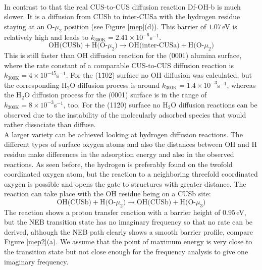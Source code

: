 \documentclass[11pt,DIV=13,BCOR=5mm,a4paper,headinclude]{scrbook}
\begin{document}
\\
In contrast to that the real CUS-to-CUS diffusion reaction Df-OH-b is much slower.
It is a diffusion from CUSb to inter-CUSa with the hydrogen residue staying at an O-$\mu_2$ position (see Figure \ref{mep}(d)).
This barrier of $1.07\,$eV is relatively high and leads to $k_{\text{300K}}=2.41\times 10^{-6}$s$^{-1}$.
\begin{equation}
 \text{OH(CUSb)} + \text{H(O-$\mu_2$)} \rightarrow \text{OH(inter-CUSa)} + \text{H(O-$\mu_2$)} \tag{Df-OH-b}
     \label{diffOHb}
\end{equation}
This is still faster than OH diffusion reaction for the (0001) alumina surface\cite{WirthJPCC2012,Wirth2014thesis}, where the rate constant of a comparable CUS-to-CUS diffusion reaction is $k_{\text{300K}}=4\times 10^{-45}$s$^{-1}$.
For the (1\=102) surface no OH diffusion was calculated, but the corresponding H$_2$O diffusion process is around $k_{\text{300K}}=1.4\times 10^{-3}$s$^{-1}$, whereas the H$_2$O diffusion process for the (0001) surface is in the range of $k_{\text{300K}}=8\times 10^{-3}$s$^{-1}$, too.
For the (11\=20) surface no H$_2$O diffusion reactions can be observed due to the instability of the molecularly adsorbed species that would rather dissociate than diffuse.
\\
A larger variety can be achieved looking at hydrogen diffusion reactions.
The different types of surface oxygen atoms and also the distances between OH and H residue make differences in the adsorption energy and also in the observed reactions.
As seen before, the hydrogen is preferably found on the twofold coordinated oxygen atom, but the reaction to a neighboring threefold coordinated oxygen is possible and opens the gate to structures with greater distance.
The reaction can take place with the OH residue being on a CUSb site:
\begin{equation}
 \text{OH(CUSb)} + \text{H(O-$\mu_2$)} \rightarrow \text{OH(CUSb)} + \text{H(O-$\mu_3$)} \tag{Df-H-a}
     \label{diffHa}
\end{equation}
The reaction shows a proton transfer reaction with a barrier height of $0.95\,$eV, but the NEB transition state has no imaginary frequency so that no rate can be derived, although the NEB path clearly shows a smooth barrier profile, compare Figure \ref{mep2}(a).
We assume that the point of maximum energy is very close to the transition state but not close enough for the frequency analysis to give one imaginary frequency.
\end{document}
